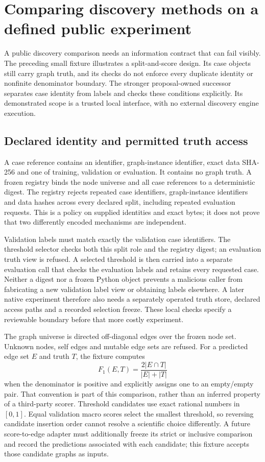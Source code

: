 \section[Enforcing a public discovery evaluation contract]{Comparing discovery methods on a defined public experiment}
\label{sec:exec28-fj-fixture}
A public discovery comparison needs an information contract that can fail visibly.
The preceding small fixture illustrates a split-and-score design. Its case objects
still carry graph truth, and its checks do not enforce every duplicate identity or
nonfinite denominator boundary. The stronger proposal-owned successor separates
case identity from labels and checks these conditions explicitly. Its demonstrated
scope is a trusted local interface, with no external discovery engine execution.
\citep{exec28_fj_contract}

\subsection{Declared identity and permitted truth access}
A case reference contains an identifier, graph-instance identifier, exact data
SHA-256 and one of training, validation or evaluation. It contains no graph
truth. A frozen registry binds the node universe and all case references to a
deterministic digest. The registry rejects repeated case identifiers, graph-instance
identifiers and data hashes across every declared split, including repeated
evaluation requests. This is a policy on supplied identities and exact bytes;
it does not prove that two differently encoded mechanisms are independent.
\citep{exec28_fj_contract}

Validation labels must match exactly the validation case identifiers. The threshold
selector checks both this split role and the registry digest; an evaluation truth
view is refused. A selected threshold is then carried into a separate evaluation
call that checks the evaluation labels and retains every requested case. Neither
a digest nor a frozen Python object prevents a malicious caller from fabricating
a new validation label view or obtaining labels elsewhere. A later native
experiment therefore also needs a separately operated truth store, declared
access paths and a recorded selection freeze. These local checks specify a
reviewable boundary before that more costly experiment.
\citep{exec28_fj_contract}

The graph universe is directed off-diagonal edges over the frozen node set.
Unknown nodes, self edges and mutable edge sets are refused. For a predicted
edge set $E$ and truth $T$, the fixture computes
\[
 F_1(E,T)=\frac{2|E\cap T|}{|E|+|T|}
\]
when the denominator is positive and explicitly assigns one to an empty/empty
pair. That convention is part of this comparison, rather than an inferred
property of a third-party scorer. Threshold candidates use exact rational
numbers in $[0,1]$. Equal validation macro scores select the smallest threshold,
so reversing candidate insertion order cannot resolve a scientific choice
differently. A future score-to-edge adapter must additionally freeze its strict
or inclusive comparison and record the predictions associated with each
candidate; this fixture accepts those candidate graphs as inputs.
\citep{exec28_fj_contract}

